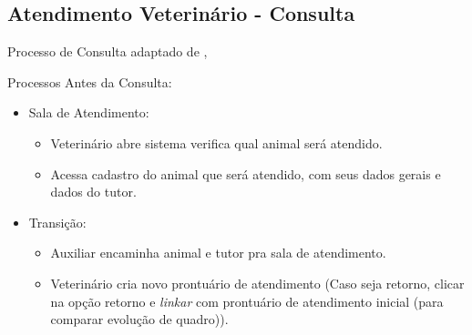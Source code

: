 \documentclass[
    12pt,               %
    openright,          %
    oneside,
    a4paper,            %
    BIBLATEX,           %
    TODO,               %
    english,            %
    brazil              %
    ]{ifsp-spo-inf-ctds}
\begin{document}
    \subsection{ Atendimento Veterinário - Consulta}
    Processo de Consulta adaptado de ,     

    
    Processos Antes da Consulta:
	
	\begin{itemize}
	    \item Sala de Atendimento:
            \begin{itemize}
                \item Veterinário abre sistema verifica qual animal será atendido.
                \item Acessa cadastro do animal que será atendido, com seus dados gerais e dados do tutor.
            \end{itemize}
	\end{itemize}
		
		
    \begin{itemize}
        \item Transição:
            \begin{itemize}
                \item Auxiliar encaminha animal e tutor pra sala de atendimento.
                \item Veterinário cria novo prontuário de atendimento (Caso seja retorno, clicar na opção retorno e \emph{linkar} com prontuário de atendimento inicial (para comparar evolução de quadro)).
            \end{itemize}
    \end{itemize}
\end{document}
